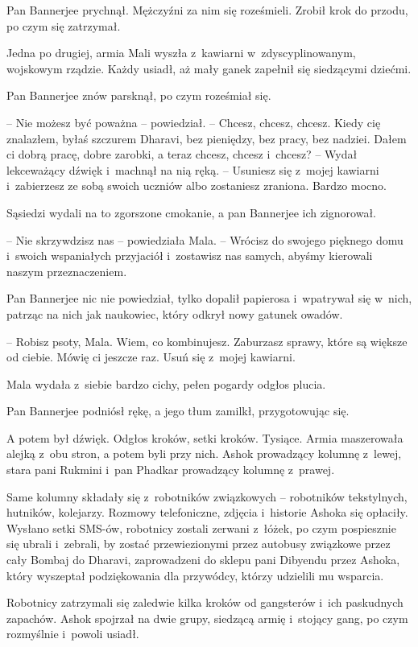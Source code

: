 \documentclass[oneside,polish,11pt,rmheadings]{mwbk}
\begin{document}
Pan Bannerjee prychnął. Mężczyźni za nim się roześmieli. Zrobił krok do przodu, po czym się zatrzymał.

Jedna po drugiej, armia Mali wyszła z~kawiarni w~zdyscyplinowanym, wojskowym rządzie. Każdy usiadł, aż mały ganek zapełnił się siedzącymi dziećmi.

Pan Bannerjee znów parsknął, po czym roześmiał się. 

-- Nie możesz być poważna -- powiedział. -- Chcesz, chcesz, chcesz. Kiedy cię znalazłem, byłaś szczurem Dharavi, bez pieniędzy, bez pracy, bez nadziei. Dałem ci dobrą pracę, dobre zarobki, a teraz chcesz, chcesz i~chcesz? -- Wydał lekceważący dźwięk i~machnął na nią ręką. -- Usuniesz się z~mojej kawiarni i~zabierzesz ze sobą swoich uczniów albo zostaniesz zraniona. Bardzo mocno.

Sąsiedzi wydali na to zgorszone cmokanie, a pan Bannerjee ich zignorował.

-- Nie skrzywdzisz nas -- powiedziała Mala. -- Wrócisz do swojego pięknego domu i~swoich wspaniałych przyjaciół i~zostawisz nas samych, abyśmy kierowali naszym przeznaczeniem.

Pan Bannerjee nic nie powiedział, tylko dopalił papierosa i~wpatrywał się w~nich, patrząc na nich jak naukowiec, który odkrył nowy gatunek owadów.

-- Robisz psoty, Mala. Wiem, co kombinujesz. Zaburzasz sprawy, które są większe od ciebie. Mówię ci jeszcze raz. Usuń się z~mojej kawiarni.

Mala wydała z~siebie bardzo cichy, pełen pogardy odgłos plucia.

Pan Bannerjee podniósł rękę, a jego tłum zamilkł, przygotowując się.

A potem był dźwięk. Odgłos kroków, setki kroków. Tysiące. Armia maszerowała alejką z~obu stron, a potem byli przy nich. Ashok prowadzący kolumnę z~lewej, stara pani Rukmini i~pan Phadkar prowadzący kolumnę z~prawej.

Same kolumny składały się z~robotników związkowych -- robotników tekstylnych, hutników, kolejarzy. Rozmowy telefoniczne, zdjęcia i~historie Ashoka się opłaciły. Wysłano setki SMS-ów, robotnicy zostali zerwani z~łóżek, po czym pospiesznie się ubrali i~zebrali, by zostać przewiezionymi przez autobusy związkowe przez cały Bombaj do Dharavi, zaprowadzeni do sklepu pani Dibyendu przez Ashoka, który wyszeptał podziękowania dla przywódcy, którzy udzielili mu wsparcia.

Robotnicy zatrzymali się zaledwie kilka kroków od gangsterów i~ich paskudnych zapachów. Ashok spojrzał na dwie grupy, siedzącą armię i~stojący gang, po czym rozmyślnie i~powoli usiadł.
\end{document}
